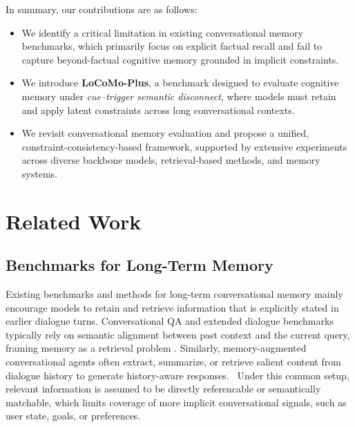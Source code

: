 \documentclass[11pt]{article}
\begin{document}
In summary, our contributions are as follows:
\begin{itemize}
    \item We identify a critical limitation in existing conversational
    memory benchmarks, which primarily focus on explicit factual recall
    and fail to capture beyond-factual cognitive memory grounded in
    implicit constraints.
    \item We introduce \textbf{LoCoMo-Plus}, a benchmark designed to
    evaluate cognitive memory under \emph{cue--trigger semantic
    disconnect}, where models must retain and apply latent constraints
    across long conversational contexts.
    \item We revisit conversational memory evaluation and propose a
    unified, constraint-consistency-based framework, supported by
    extensive experiments across diverse backbone models,
    retrieval-based methods, and memory systems.
\end{itemize}



\section{Related Work}

\subsection{Benchmarks for Long-Term Memory}

Existing benchmarks and methods for long-term conversational memory mainly
encourage models to retain and retrieve information that is explicitly
stated in earlier dialogue turns.
Conversational QA and extended dialogue benchmarks typically rely on
semantic alignment between past context and the current query, framing
memory as a retrieval problem
\cite{reddy2019coqa,xu2022beyond,maharana2024evaluating,pan2025memory}.
Similarly, memory-augmented conversational agents often extract,
summarize, or retrieve salient content from dialogue history to generate
history-aware responses.~\cite{packer2023memgpt,zhong2024memorybank,rasmussen2025zep,llamaindex_chat_memory_buffer_2023,langchain_conversation_summary_memory_2023}
Under this common setup, relevant information is assumed to be directly
referencable or semantically matchable, which limits coverage of more
implicit conversational signals, such as user state, goals, or
preferences.
\end{document}
